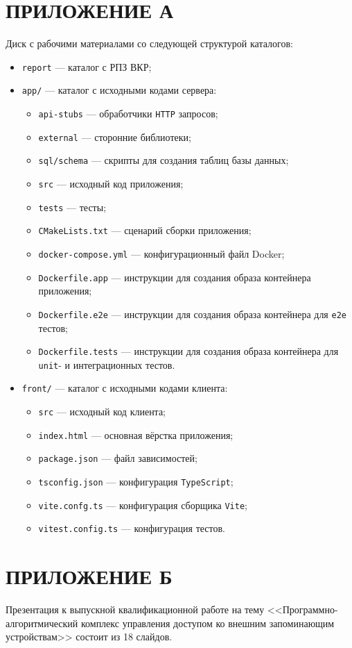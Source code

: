 \chapter*{ПРИЛОЖЕНИЕ А}

Диск с рабочими материалами со следующей структурой каталогов:

\begin{itemize}[label=---]
    \item \texttt{report} --- каталог с РПЗ ВКР;
    \item \texttt{app/} --- каталог с исходными кодами сервера:
    \begin{itemize}[label=---]
        \item \texttt{api-stubs} --- обработчики \texttt{HTTP} запросов;
        \item \texttt{external} --- сторонние библиотеки;
        \item \texttt{sql/schema} --- скрипты для создания таблиц базы данных;
        \item \texttt{src} --- исходный код приложения;
        \item \texttt{tests} --- тесты;
        \item \texttt{CMakeLists.txt} --- сценарий сборки приложения;
        \item \texttt{docker-compose.yml} --- конфигурационный файл Docker;
        \item \texttt{Dockerfile.app} --- инструкции для создания образа контейнера приложения;
        \item \texttt{Dockerfile.e2e} --- инструкции для создания образа контейнера для \texttt{e2e} тестов;
        \item \texttt{Dockerfile.tests} --- инструкции для создания образа контейнера для \texttt{unit}- и интеграционных тестов.
    \end{itemize}
    \item \texttt{front/} --- каталог с исходными кодами клиента:
    \begin{itemize}[label=---]
        \item \texttt{src} --- исходный код клиента;
        \item \texttt{index.html} --- основная вёрстка приложения;
        \item \texttt{package.json} --- файл зависимостей;
        \item \texttt{tsconfig.json} --- конфигурация \texttt{TypeScript};
        \item \texttt{vite.confg.ts} --- конфигурация сборщика \texttt{Vite};
        \item \texttt{vitest.config.ts} --- конфигурация тестов.
    \end{itemize}
\end{itemize}

\chapter*{ПРИЛОЖЕНИЕ Б}

Презентация к выпускной квалификационной работе на тему 
<<Программно-алгоритмический комплекс управления доступом ко внешним запоминающим устройствам>>
состоит из 18 слайдов.